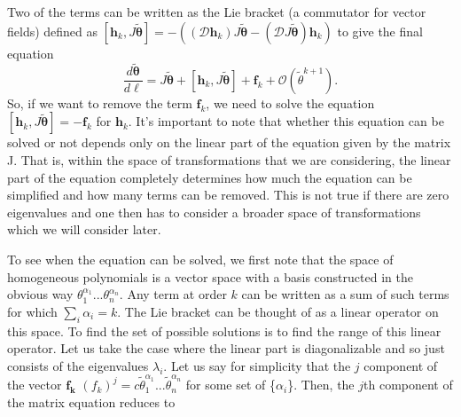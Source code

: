\documentclass[
 reprint,
 amsmath,amssymb,
 aps, superscriptaddress, pre
]{revtex4-1}
\begin{document}
Two of the terms can be written as the Lie bracket (a commutator for vector fields) defined as $[\bm{h}_k, J \bm{\tilde \theta}] = - ( (\mathcal{D} \bm{h}_k) J \bm{\tilde \theta} - (\mathcal{D} J \bm{\tilde \theta}) \bm{h}_k)$  to give the final equation 
\begin{equation}
 \frac{d \bm{\tilde \theta}}{d \ell} = J \bm{\tilde \theta} + [\bm{h}_k, J \bm{\tilde \theta}] + \bm{f}_k + \mathcal{O}({\tilde \theta}^{k+1}) .
\end{equation}
So, if we want to remove the term $\bm{f}_k$, we need to solve the equation  $[\bm{h}_k, J \bm{\tilde \theta}] =  -\bm{f}_k$ for $\bm{h}_k$. It's important to note that whether this equation can be solved or not depends only on the linear part of the equation given by the matrix J. That is, within the space of transformations that we are considering, the linear part of the equation completely determines how much the equation can be simplified and how many terms can be removed. This is not true if there are zero eigenvalues and one then has to consider a broader space of transformations which we will consider later.

To see when the equation can be solved, we first note that the space of homogeneous polynomials is a vector space with a basis constructed in the obvious way $\theta_1^{\alpha_1}...\theta_n^{\alpha_n}$. Any term at order $k$ can be written as a sum of such terms for which $\sum_i \alpha_i = k$. The Lie bracket can be thought of as a linear operator on this space. To find the set of possible solutions is to find the range of this linear operator. Let us take the case where the linear part is diagonalizable and so just consists of the eigenvalues $\lambda_i$. Let us say for simplicity that the $j$ component of the vector $\bm{f_k}$ $(f_k)^j = c {\tilde \theta}_1^{\alpha_1}...{\tilde \theta}_n^{\alpha_n}$ for some set of \{$\alpha_i$\}. Then, the $j$th component of the matrix equation reduces to
\end{document}
